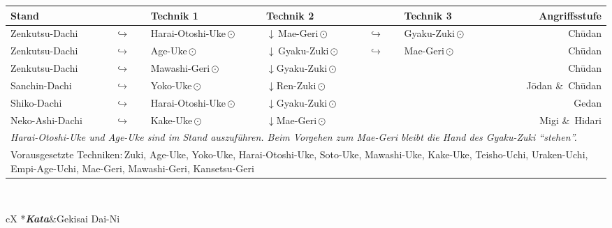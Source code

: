 \begin{tcolorbox}[width=\textwidth,height=\textheight,right=12pt,left=12pt,colframe=BLBELT,colback=white,fonttitle=\bfseries,coltitle=white,title=5. Kyu:\indent Kihon-Ido Kata - Partnerformen - Erwartungshorizont]
\null\vfill\null
{}
	\begin{tabularx}{\textwidth}{lllllXr}
		\textbf{Stand} 	&  	& \textbf{Technik 1} & \textbf{Technik 2} & &\textbf{Technik 3} & \textbf{Angriffsstufe}\\
		\midrule
		Zenkutsu-Dachi 	& \(\hookrightarrow\)	& Harai-Otoshi-Uke\,\(\odot\) 	& \(\downarrow\)\,Mae-Geri\,\(\odot\)	& \(\hookrightarrow\) 	& Gyaku-Zuki\,\(\odot\)	& Ch\={u}dan \\
		Zenkutsu-Dachi 	& \(\hookrightarrow\)	& Age-Uke\,\(\odot\) 			& \(\downarrow\)\,Gyaku-Zuki\,\(\odot\) & \(\hookrightarrow\)	& Mae-Geri\,\(\odot\)	& Ch\={u}dan \\
		Zenkutsu-Dachi 	& \(\hookrightarrow\)	& Mawashi-Geri\,\(\odot\) 		& \(\downarrow\)Gyaku-Zuki\,\(\odot\) 				&						&	 					& Ch\={u}dan \\
		Sanchin-Dachi 	& \(\hookrightarrow\)	& Yoko-Uke\,\(\odot\) 			& \(\downarrow\)Ren-Zuki\,\(\odot\) 					&						& 						& J\={o}dan \&~Ch\={u}dan \\
		Shiko-Dachi 	& \(\hookrightarrow\)	& Harai-Otoshi-Uke\,\(\odot\) 	& \(\downarrow\)Gyaku-Zuki\,\(\odot\) 				&						& 						& Gedan \\
		Neko-Ashi-Dachi	& \(\hookrightarrow\)	& Kake-Uke\,\(\odot\) 			& \(\downarrow\)Mae-Geri\,\(\odot\) 					&						& 						& Migi \&~Hidari  \\
		\multicolumn{7}{l}{{\scriptsize \textit{Harai-Otoshi-Uke und Age-Uke sind im Stand auszuführen. Beim Vorgehen zum Mae-Geri bleibt die Hand des Gyaku-Zuki \textquotedblleft{stehen}\textquotedblright .}}}\\
		\midrule
		\multicolumn{7}{p{\linewidth-2\tabcolsep}}{{\footnotesize Vorausgesetzte Techniken:\,Zuki, Age-Uke, Yoko-Uke, Harai-Otoshi-Uke, Soto-Uke, Mawashi-Uke, Kake-Uke, Teisho-Uchi, Uraken-Uchi, Empi-Age-Uchi, Mae-Geri, Mawashi-Geri, Kansetsu-Geri}}\\
		\midrule
	\end{tabularx}\\
	\null\vfill\null
	\begin{minipage}[t]{0.45\textwidth}
		\begin{tabularx}{\textwidth}{cX}
			\midrule
			*{\textbf{\textit{Kata}}}&Gekisai Dai-Ni\\

\end{tabularx}
\end{minipage}
\end{tcolorbox}
